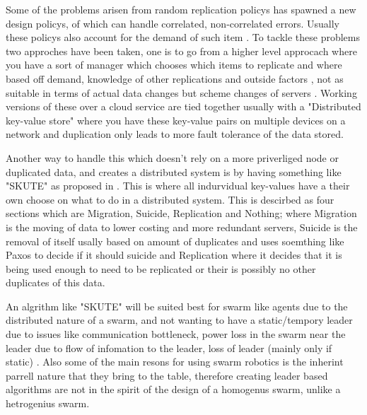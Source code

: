 \documentclass{UoYCSproject}
\begin{document}
Some of the problems arisen from random replication policys has spawned a new design policys, of which can handle correlated, non-correlated errors.
Usually these policys also account for the demand of such item \cite{Avalability storage, Distributed Storage}.
To tackle these problems two approches have been taken, one is to go from a higher level approcach where you have a sort of manager which chooses which items to replicate and where based off demand, knowledge of other replications and outside factors \cite{Avalability storage, Patent}, not as suitable in terms of actual data changes but scheme changes of servers \cite{Scheme changes}.
Working versions of these over a cloud service are tied together usually with a "Distributed key-value store"  \cite{Key-Value} where you have these key-value pairs on multiple devices on a network and duplication only leads to more fault tolerance of the data stored.

Another way to handle this which doesn't rely on a more priverliged node or duplicated data, and creates a distributed system is by having something like "SKUTE" as proposed in \cite{Distributed Storage}.
This is where all indurvidual key-values have a their own choose on what to do in a distributed system.
This is descirbed as four sections which are Migration, Suicide, Replication and Nothing; where Migration is the moving of data to lower costing and more redundant servers, Suicide is the removal of itself usally based on amount of duplicates and uses soemthing like Paxos \cite{Paxos} to decide if it should suicide and Replication where it decides that it is being used enough to need to be replicated or their is possibly no other duplicates of this data.

An algrithm like "SKUTE" \cite{Distributed Storage, Quorum} will be suited best for swarm like agents due to the distributed nature of a swarm, and not wanting to have a static/tempory leader due to issues like communication bottleneck, power loss in the swarm near the leader due to flow of infomation to the leader, loss of leader (mainly only if static) \cite{Swarm robotics reviewed, Swarm intellegiegence}.
Also some of the main resons for using swarm robotics is the inherint parrell nature that they bring to the table, therefore creating leader based algorithms are not in the spirit of the design of a homogenus swarm, unlike a hetrogenius swarm.
\end{document}
